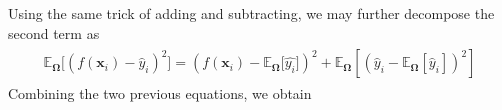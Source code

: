 \documentclass[dvipsnames, article, a4paper, oneside, 12pt]{memoir}
\newcommand{\x}{\bm{x}}
\newcommand{\expect}{\mathbb{E}}
\newcommand{\data}{\bm{\Omega}}
\begin{document}
  Using the same trick of adding and subtracting, we may further decompose the second term as
  \begin{align}
    \begin{split}
      \expect_{\data} \big[ (f(\x_i) - \hat{y}_i)^2\big] = \left(f(\x_i) - \expect_{\data}\big[\hat{y_i}\big]\right)^2 + \expect_{\data} \left[\left(\hat{y}_i - \expect_{\data}\left[\hat{y}_i\right]\right)^2\right]
    \end{split}
  \end{align}
  \fi
  Combining the two previous equations, we obtain
 
\printbibliography
\end{document}
